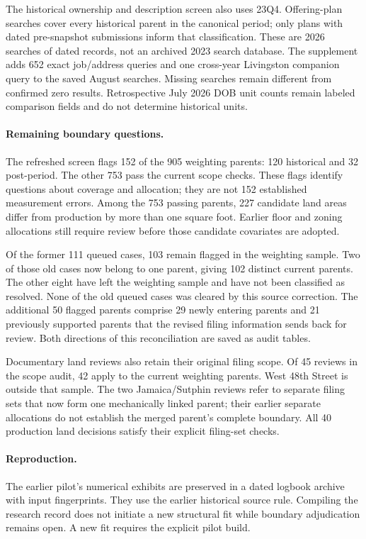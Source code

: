 The historical ownership and description screen also uses 23Q4. Offering-plan
searches cover every historical parent in the canonical period; only plans
with dated pre-snapshot submissions inform that classification. These are
2026 searches of dated records, not an archived 2023 search database. The
supplement adds 652 exact job/address queries and one cross-year Livingston
companion query to the saved August searches. Missing searches remain
different from confirmed zero results. Retrospective July 2026 DOB unit
counts remain labeled comparison fields and do not determine historical units.

\paragraph{Remaining boundary questions.}
The refreshed screen flags 152 of the 905 weighting parents: 120 historical
and 32 post-period. The other 753 pass the current scope checks. These flags
identify questions about coverage and allocation; they are not 152 established
measurement errors. Among the 753 passing parents, 227 candidate land areas
differ from production by more than one square foot. Earlier floor and zoning
allocations still require review before those candidate covariates are adopted.

Of the former 111 queued cases, 103 remain flagged in the weighting sample.
Two of those old cases now belong to one parent, giving 102 distinct current
parents. The other eight have left the weighting sample and have not been
classified as resolved. None of the old queued cases was cleared by this
source correction. The additional 50 flagged parents comprise 29 newly
entering parents and 21 previously supported parents that the revised filing
information sends back for review. Both directions of this reconciliation
are saved as audit tables.

Documentary land reviews also retain their original filing scope. Of 45
reviews in the scope audit, 42 apply to the current weighting parents.
West 48th Street is outside that sample. The two Jamaica/Sutphin reviews
refer to separate filing sets that now form one mechanically linked parent;
their earlier separate allocations do not establish the merged parent's
complete boundary. All 40 production land decisions satisfy their explicit
filing-set checks.

\paragraph{Reproduction.}
The earlier pilot's numerical exhibits are preserved in a dated logbook archive
with input fingerprints. They use the earlier historical source rule. Compiling
the research record does not initiate a new structural fit while boundary
adjudication remains open. A new fit requires the explicit pilot build.

